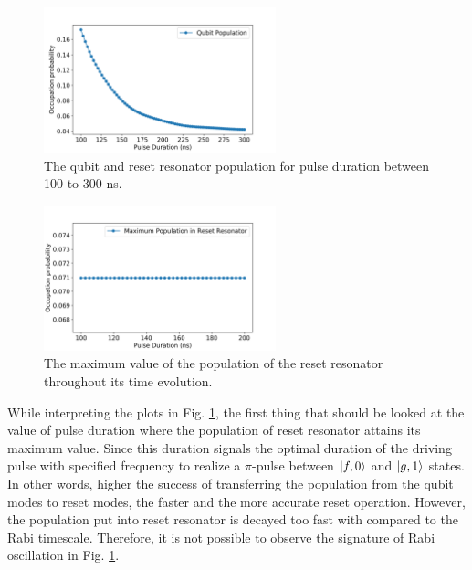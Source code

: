 \begin{figure}[h!]
    \centering
    \includegraphics[width=0.6\textwidth]{pic/different_reset_schemes/qubit_pop_710_tau_sweep_100_300.png}
    \caption{The qubit and reset resonator population for pulse duration between 100 to 300 ns.}
    \label{fig:tau_sweep_qubit}
\end{figure}

\begin{figure}[h!]
    \centering
    \includegraphics[width=0.6\textwidth]{pic/different_reset_schemes/reset_pop_max.png}
    \caption{The maximum value of the population of the reset resonator throughout its time evolution.}
    \label{fig:tau_sweep_reset}
\end{figure}


 While interpreting the plots in Fig. \ref{fig:tau_sweep_qubit}, the first thing that should be looked at the value of pulse duration where the population of reset resonator attains its maximum value. Since this duration signals the optimal duration of the driving pulse with specified frequency to realize a $\pi$-pulse between $\ket{f,0}$ and $\ket{g,1}$ states. In other words, higher the success of transferring the population from the qubit modes to reset modes, the faster and the more accurate reset operation. However, the population put into reset resonator is decayed too fast with compared to the Rabi timescale. Therefore, it is not possible to observe the signature of Rabi oscillation in Fig. \ref{fig:tau_sweep_qubit}. 



